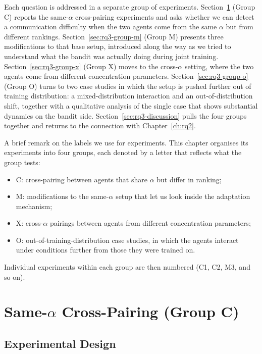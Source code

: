 Each question is addressed in a separate group of experiments. Section~\ref{sec:rq3-group-c} (Group C) reports the same-$\alpha$ cross-pairing experiments and asks whether we can detect a communication difficulty when the two agents come from the same $\alpha$ but from different rankings. Section~\ref{sec:rq3-group-m} (Group M) presents three modifications to that base setup, introduced along the way as we tried to understand what the bandit was actually doing during joint training. Section~\ref{sec:rq3-group-x} (Group X) moves to the cross-$\alpha$ setting, where the two agents come from different concentration parameters. Section~\ref{sec:rq3-group-o} (Group O) turns to two case studies in which the setup is pushed further out of training distribution: a mixed-distribution interaction and an out-of-distribution shift, together with a qualitative analysis of the single case that shows substantial dynamics on the bandit side. Section~\ref{sec:rq3-discussion} pulls the four groups together and returns to the connection with Chapter~\ref{ch:rq2}.

A brief remark on the labels we use for experiments. This chapter organises its experiments into four groups, each denoted by a letter that reflects what the group tests:

\begin{itemize}
    \item C: cross-pairing between agents that share $\alpha$ but differ in ranking;
    \item M: modifications to the same-$\alpha$ setup that let us look inside the adaptation mechanism;
    \item X: cross-$\alpha$ pairings between agents from different concentration parameters;
    \item O: out-of-training-distribution case studies, in which the agents interact under conditions further from those they were trained on.
\end{itemize}

Individual experiments within each group are then numbered (C1, C2, M3, and so on).

\section{Same-$\alpha$ Cross-Pairing (Group C)}
\label{sec:rq3-group-c}

\subsection{Experimental Design}
\label{sec:rq3-c-design}

